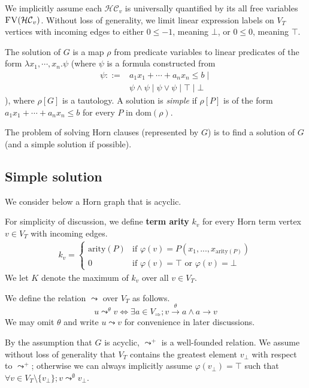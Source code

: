\documentclass[a4paper,12pt]{article}
\newcommand{\edge}[2]{#1\rightarrow#2}
\newcommand{\edgel}[3]{#1\xrightarrow{#2}#3}
\begin{document}
We implicitly assume each $\mathcal{HC}_v$ is universally quantified
by its all free variables $\textsc{FV}(\mathcal{HC}_v)$.  Without loss
of generality, we limit linear expression labels on $V_T$ vertices
with incoming edges to either $0 \leq -1$, meaning $\bot$, or $0 \leq
0$, meaning $\top$.

The solution of $G$ is a map $\rho$ from predicate variables to linear
predicates of the form $\lambda x_1, \cdots ,x_n. \psi $ (where $\psi$
is a formula constructed from
\begin{align*}
\psi ::= & a_1 x_1 + \cdots + a_n x_n \leq b \mid \\
& \psi \wedge \psi \mid \psi \vee \psi \mid \top \mid \bot
\end{align*}
), where $\rho[G]$ is a tautology. A solution is \textit{simple} if
$\rho[P]$ is of the form $a_1 x_1 + \cdots + a_n x_n \leq b$ for every
$P$ in $\mathrm{dom}(\rho)$.

The problem of solving Horn clauses (represented by $G$) is to find a
solution of $G$ (and a simple solution if possible).

\subsection{Simple solution}

We consider below a Horn graph that is acyclic.

For simplicity of discussion, we define \textbf{term arity} $k_v$ for
every Horn term vertex $v \in V_T$ with incoming edges.
\begin{align*}
k_v =
\begin{cases}
\mathrm{arity}(P) & \mbox{if } \varphi(v) = P(x_1,...,x_{\mathrm{arity}(P)}) \\
0 & \mbox{if } \varphi(v) = \top \mbox { or } \varphi(v) = \bot
\end{cases}
\end{align*}
We let $K$ denote the maximum of $k_v$ over all $v \in V_T$.

We define the relation $\leadsto$ over $V_T$ as follows.
\[ u \mathop{\leadsto}^\theta v \Longleftrightarrow
\exists a \in V_\Rightarrow; \edgel{v}{\theta}{a} \wedge \edge{a}{v} \]
We may omit $\theta$ and write $u \leadsto v$ for convenience in later
discussions.

By the assumption that $G$ is acyclic, $\leadsto^+$ is a well-founded
relation. We assume without loss of generality that $V_T$ contains the
greatest element $v_\bot$ with respect to $\leadsto^+$; otherwise we
can always implicitly assume $\varphi(v_\bot) = \top$ such that
$\forall v \in V_T \setminus \{v_\bot\}; v \mathop{\leadsto}^\emptyset v_\bot$.
\end{document}
